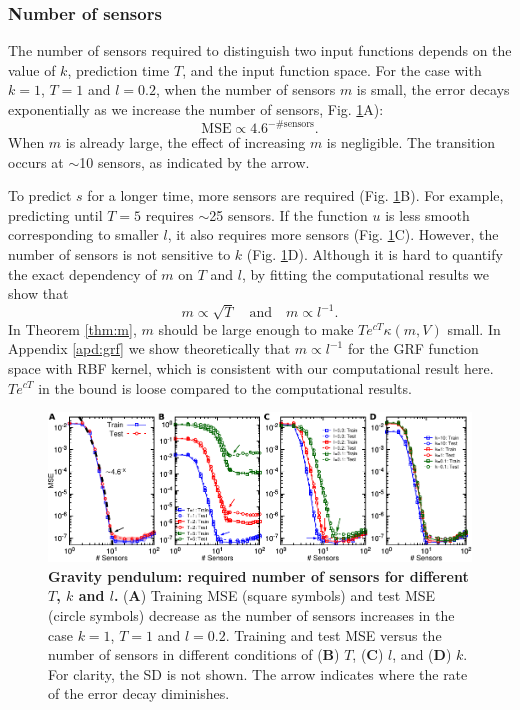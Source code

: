 \documentclass[11pt]{article}
\begin{document}
\subsubsection{Number of sensors}
\label{sec:sensor}

The number of sensors required to distinguish two input functions depends on the value of $k$, prediction time $T$, and the input function space. For the case with $k=1$, $T=1$ and $l=0.2$, when the number of sensors $m$ is small, the error decays exponentially as we increase the  number  of sensors, Fig. \ref{fig:m}A):
\[ \text{MSE} \propto 4.6^{-\# \text{sensors}}. \]
When $m$ is already large, the effect of increasing $m$ is negligible. The transition occurs at $\sim$10 sensors, as indicated by the arrow.

To predict $s$ for a longer time, more sensors are required (Fig. \ref{fig:m}B). For example, predicting until $T=5$ requires $\sim$25 sensors. If the function $u$ is less smooth corresponding to smaller $l$, it also requires more sensors (Fig. \ref{fig:m}C). However, the number of sensors is not sensitive to $k$ (Fig. \ref{fig:m}D). Although it is hard to quantify the exact dependency of $m$ on $T$ and $l$, by fitting the computational results we show that
$$m \propto \sqrt{T} \quad \text{and} \quad m \propto l^{-1}.$$
In Theorem \ref{thm:m}, $m$ should be large enough to make $Te^{cT}\kappa(m,V)$ small. In Appendix \ref{apd:grf} we show theoretically that $m \propto l^{-1}$ for the GRF function space with RBF kernel, which is consistent with our computational result here. $Te^{cT}$ in the bound is loose compared to the computational results.

\begin{figure}[htbp]
\centering
\includegraphics{m.pdf}
\caption{\textbf{Gravity pendulum: required number of sensors for different $T$, $k$ and $l$.} (\textbf{A}) Training MSE (square symbols) and test MSE (circle symbols) decrease as the number of sensors increases in the case $k=1$, $T=1$ and $l=0.2$. Training and test MSE versus the number of sensors in different conditions of (\textbf{B}) $T$, (\textbf{C}) $l$, and (\textbf{D}) $k$. For clarity, the SD is not shown. The arrow indicates where the rate of the error decay diminishes.}
\label{fig:m}
\end{figure}
\end{document}
